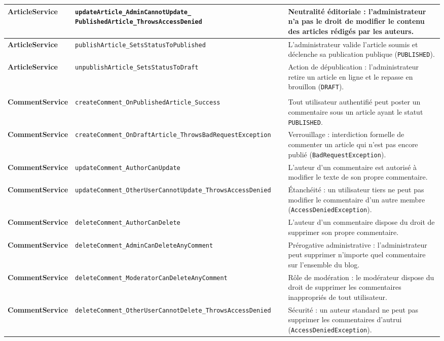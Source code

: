 \documentclass[11pt,a4paper]{article}
\newcommand{\testmethod}[1]{{\ttfamily\scriptsize\nolinkurl{#1}}}
\begin{document}
\begin{longtable}{|>{\raggedright\arraybackslash\bfseries}p{2.7cm}|>{\raggedright\arraybackslash}p{4.8cm}|>{\raggedright\arraybackslash}p{7.2cm}|}
\hline
ArticleService & \testmethod{updateArticle_AdminCannotUpdate_} \testmethod{PublishedArticle_ThrowsAccessDenied} & Neutralité éditoriale : l'administrateur n'a pas le droit de modifier le contenu des articles rédigés par les auteurs. \\
\hline
ArticleService & \testmethod{publishArticle_SetsStatusToPublished} & L'administrateur valide l'article soumis et déclenche sa publication publique (\texttt{PUBLISHED}). \\
\hline
ArticleService & \testmethod{unpublishArticle_SetsStatusToDraft} & Action de dépublication : l'administrateur retire un article en ligne et le repasse en brouillon (\texttt{DRAFT}). \\
\hline

\multicolumn{3}{|l|}{\cellcolor{gray!20}\textbf{4. Service des commentaires (\texttt{CommentServiceTest} - 8 tests)}} \\
\hline
CommentService & \testmethod{createComment_OnPublishedArticle_Success} & Tout utilisateur authentifié peut poster un commentaire sous un article ayant le statut \texttt{PUBLISHED}. \\
\hline
CommentService & \testmethod{createComment_OnDraftArticle_ThrowsBadRequestException} & Verrouillage : interdiction formelle de commenter un article qui n'est pas encore publié (\texttt{BadRequestException}). \\
\hline
CommentService & \testmethod{updateComment_AuthorCanUpdate} & L'auteur d'un commentaire est autorisé à modifier le texte de son propre commentaire. \\
\hline
CommentService & \testmethod{updateComment_OtherUserCannotUpdate_ThrowsAccessDenied} & Étanchéité : un utilisateur tiers ne peut pas modifier le commentaire d'un autre membre (\texttt{AccessDeniedException}). \\
\hline
CommentService & \testmethod{deleteComment_AuthorCanDelete} & L'auteur d'un commentaire dispose du droit de supprimer son propre commentaire. \\
\hline
CommentService & \testmethod{deleteComment_AdminCanDeleteAnyComment} & Prérogative administrative : l'administrateur peut supprimer n'importe quel commentaire sur l'ensemble du blog. \\
\hline
CommentService & \testmethod{deleteComment_ModeratorCanDeleteAnyComment} & Rôle de modération : le modérateur dispose du droit de supprimer les commentaires inappropriés de tout utilisateur. \\
\hline
CommentService & \testmethod{deleteComment_OtherUserCannotDelete_ThrowsAccessDenied} & Sécurité : un auteur standard ne peut pas supprimer les commentaires d'autrui (\texttt{AccessDeniedException}). \\
\hline


\end{longtable}
\end{document}
